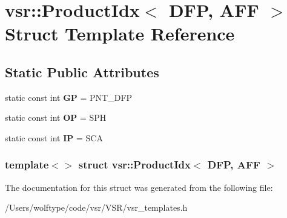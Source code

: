 \hypertarget{structvsr_1_1_product_idx_3_01_d_f_p_00_01_a_f_f_01_4}{\section{vsr\-:\-:Product\-Idx$<$ D\-F\-P, A\-F\-F $>$ Struct Template Reference}
\label{structvsr_1_1_product_idx_3_01_d_f_p_00_01_a_f_f_01_4}
}
\subsection*{Static Public Attributes}
\begin{DoxyCompactItemize}
\item 
\hypertarget{structvsr_1_1_product_idx_3_01_d_f_p_00_01_a_f_f_01_4_ab77282f801034493cf7c8e87367346fe}{static const int {\bfseries G\-P} = P\-N\-T\-\_\-\-D\-F\-P}\label{structvsr_1_1_product_idx_3_01_d_f_p_00_01_a_f_f_01_4_ab77282f801034493cf7c8e87367346fe}

\item 
\hypertarget{structvsr_1_1_product_idx_3_01_d_f_p_00_01_a_f_f_01_4_aee8d74f1bb305228fa0b7b06d38bff11}{static const int {\bfseries O\-P} = S\-P\-H}\label{structvsr_1_1_product_idx_3_01_d_f_p_00_01_a_f_f_01_4_aee8d74f1bb305228fa0b7b06d38bff11}

\item 
\hypertarget{structvsr_1_1_product_idx_3_01_d_f_p_00_01_a_f_f_01_4_add3d8309d86eacd28639e6cde2d38b23}{static const int {\bfseries I\-P} = S\-C\-A}\label{structvsr_1_1_product_idx_3_01_d_f_p_00_01_a_f_f_01_4_add3d8309d86eacd28639e6cde2d38b23}

\end{DoxyCompactItemize}
\subsubsection*{template$<$$>$ struct vsr\-::\-Product\-Idx$<$ D\-F\-P, A\-F\-F $>$}



The documentation for this struct was generated from the following file\-:\begin{DoxyCompactItemize}
\item 
/\-Users/wolftype/code/vsr/\-V\-S\-R/vsr\-\_\-templates.\-h\end{DoxyCompactItemize}
